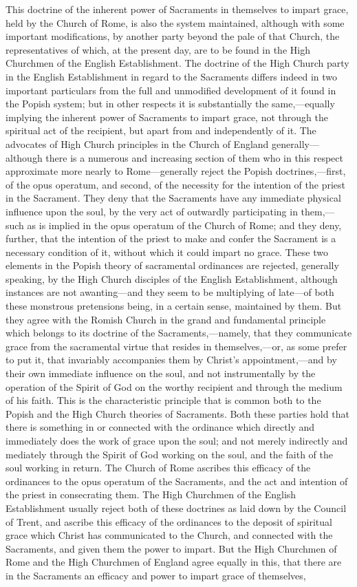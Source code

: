 \documentclass[]{book}
\begin{document}
This doctrine of the inherent power of Sacraments in themselves to impart grace, held by the Church of Rome, is also the system maintained, although with some important modifications, by another party beyond the pale of that Church, the representatives of which, at the present day, are to be found in the High Churchmen of the English Establishment. The doctrine of the High Church party in the English Establishment in regard to the Sacraments differs indeed in two important particulars from the full and unmodified development of it found in the Popish system; but in other respects it is substantially the same,---equally implying the inherent power of Sacraments to impart grace, not through the spiritual act of the recipient, but apart from and independently of it. The advocates of High Church principles in the Church of England generally---although there is a numerous and increasing section of them who in this respect approximate more nearly to Rome---generally reject the Popish doctrines,---first, of the opus operatum, and second, of the necessity for the intention of the priest in the Sacrament. They deny that the Sacraments have any immediate physical influence upon the soul, by the very act of outwardly participating in them,---such as is implied in the opus operatum of the Church of Rome; and they deny, further, that the intention of the priest to make and confer the Sacrament is a necessary condition of it, without which it could impart no grace. These two elements in the Popish theory of sacramental ordinances are rejected, generally speaking, by the High Church disciples of the English Establishment, although instances are not awanting---and they seem to be multiplying of late---of both these monstrous pretensions being, in a certain sense, maintained by them. But they agree with the Romish Church in the grand and fundamental principle which belongs to its doctrine of the Sacraments,---namely, that they communicate grace from the sacramental virtue that resides in themselves,---or, as some prefer to put it, that invariably accompanies them by Christ's appointment,---and by their own immediate influence on the soul, and not instrumentally by the operation of the Spirit of God on the worthy recipient and through the medium of his faith. This is the characteristic principle that is common both to the Popish and the High Church theories of Sacraments. Both these parties hold that there is something in or connected with the ordinance which directly and immediately does the work of grace upon the soul; and not merely indirectly and mediately through the Spirit of God working on the soul, and the faith of the soul working in return. The Church of Rome ascribes this efficacy of the ordinances to the opus operatum of the Sacraments, and the act and intention of the priest in consecrating them. The High Churchmen of the English Establishment usually reject both of these doctrines as laid down by the Council of Trent, and ascribe this efficacy of the ordinances to the deposit of spiritual grace which Christ has communicated to the Church, and connected with the Sacraments, and given them the power to impart. But the High Churchmen of Rome and the High Churchmen of England agree equally in this, that there are in the Sacraments an efficacy and power to impart grace of themselves, 
\end{document}
